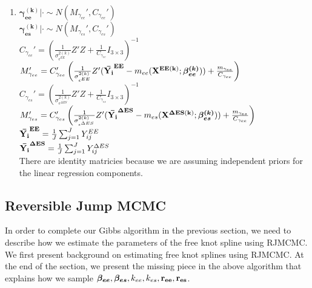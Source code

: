 \documentclass[11pt]{article}\usepackage[]{graphicx}\usepackage[]{color}
\begin{document}
\begin{enumerate}
\begin{enumerate}
\item
$\boldsymbol{\gamma_{ee}^{(k)}}|\cdot \sim N(M_{\gamma_{ee}}',C_{\gamma_{ee}}')$ \\
$\boldsymbol{\gamma_{es}^{(k)}}|\cdot \sim N(M_{\gamma_{es}}',C_{\gamma_{es}}')$ \\

$C_{\gamma_{ee}}' = \left( \frac{1}{\sigma^{2(k)}_{\epsilon^{EE}}} Z'Z + \frac{1}{C_{\gamma_{ee}}} I_{3 \times 3} \right)^{-1} $\\
$M_{\gamma_{ee}}' = C_{\gamma_{ee}}' \left( \frac{1}{\sigma^{2(k)}_{\epsilon^{EE}}} Z'({\bf \bar{Y_i}^{EE}} - m_{ee}({\bf X^{EE(k)}};\boldsymbol{\beta_{ee}^{(k)}})) + \frac{m_{\gamma_{ee}}}{C_{\gamma_{ee}} } \right)$ \\

$C_{\gamma_{es}}' = \left( \frac{1}{\sigma^{2(k)}_{\epsilon^{\Delta ES}}} Z'Z + \frac{1}{C_{\gamma_{es}}} I_{3 \times 3} \right)^{-1} $\\
$M_{\gamma_{es}}' = C_{\gamma_{es}}' \left( \frac{1}{\sigma^{2(k)}_{\epsilon^{\Delta ES}}} Z'({\bf \bar{Y_i}^{\Delta ES}} - m_{es}({\bf X^{\Delta ES(k)}};\boldsymbol{\beta_{es}^{(k)}})) + \frac{m_{\gamma_{es}}}{C_{\gamma_{ee}} } \right)$ \\

${\bf \bar{Y_i}^{EE}} = \frac{1}{J} \sum_{j=1}^{J} Y_{ij}^{EE}$ \\
${\bf \bar{Y_i}^{\Delta ES}} = \frac{1}{J} \sum_{j=1}^{J} Y_{ij}^{\Delta ES}$ \\

There are identity matricies because we are assuming independent priors for the linear regression components. 
\end{enumerate}

\end{enumerate}



\subsection{Reversible Jump MCMC}
In order to complete our Gibbs algorithm in the previous section, we need to describe how we estimate the parameters of the free knot spline using RJMCMC. We first present background on estimating free knot splines using RJMCMC. At the end of the section, we present the missing piece in the above algorithm that explains how we sample ${\boldsymbol{\beta_{ee}},\boldsymbol{\beta_{es}}},k_{ee},k_{es}, {\bf  r_{ee}, r_{es}}$. 
\end{document}
